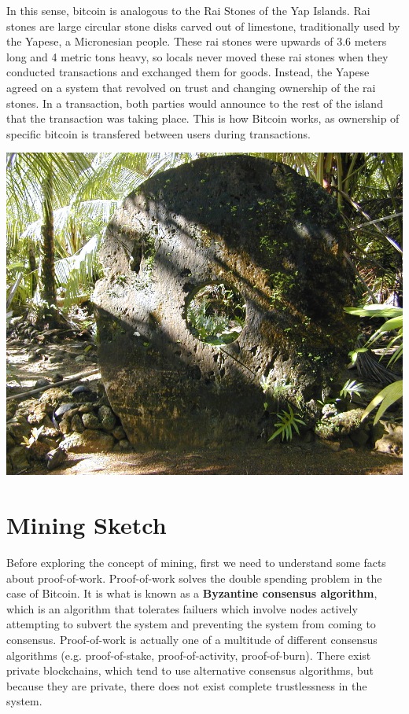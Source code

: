 \documentclass[11pt]{article}
\begin{document}
    In this sense, bitcoin is analogous to the Rai Stones of the Yap Islands. Rai stones are large circular stone disks carved out of limestone, traditionally used by the Yapese, a Micronesian people. These rai stones were upwards of 3.6 meters long and 4 metric tons heavy, so locals never moved these rai stones when they conducted transactions and exchanged them for goods. Instead, the Yapese agreed on a system that revolved on trust and changing ownership of the rai stones. In a transaction, both parties would announce to the rest of the island that the transaction was taking place. This is how Bitcoin works, as ownership of specific bitcoin is transfered between users during transactions.
    
    \includegraphics[scale=0.7]{rai}

    
    \section*{Mining Sketch}
    
    Before exploring the concept of mining, first we need to understand some facts about proof-of-work. Proof-of-work solves the double spending problem in the case of Bitcoin. It is what is known as a \textbf{Byzantine consensus algorithm}, which is an algorithm that tolerates failuers which involve nodes actively attempting to subvert the system and preventing the system from coming to consensus. Proof-of-work is actually one of a multitude of different consensus algorithms (e.g. proof-of-stake, proof-of-activity, proof-of-burn). There exist private blockchains, which tend to use alternative consensus algorithms, but because they are private, there does not exist complete trustlessness in the system.
    
\end{document}
